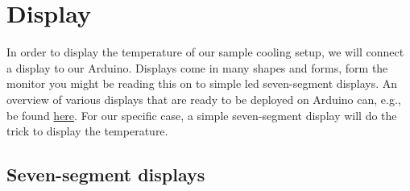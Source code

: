 
\chapter{Display}

In order to display the temperature of our sample cooling setup, we will connect a display to our Arduino. Displays come in many shapes and forms, form the monitor you might be reading this on to simple \ac{led} seven-segment displays. An overview of various displays that are ready to be deployed on Arduino can, e.g., be found \href{https://www.arduino.cc/reference//en/libraries/category/display/}{here}. For our specific case, a simple seven-segment display will do the trick to display the temperature.

\section{Seven-segment displays} 

